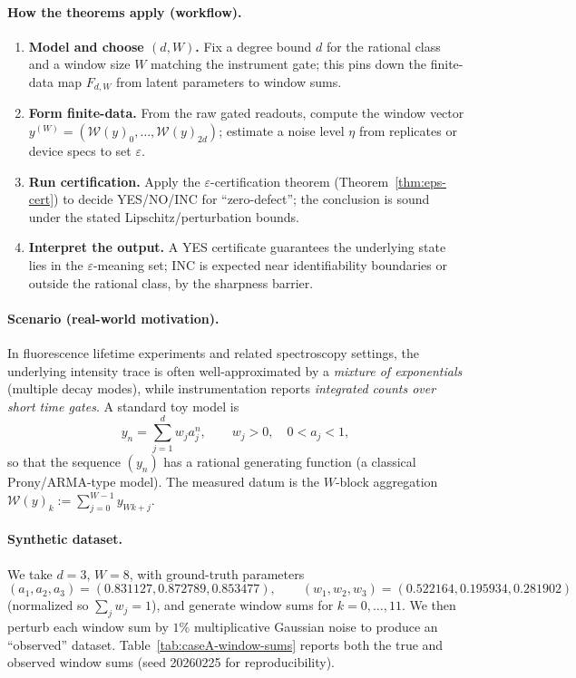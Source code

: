 \documentclass[11pt,reqno]{amsart}
\theoremstyle{definition}
\theoremstyle{remark}
\newcommand{\1}{\mathbf{1}}
\begin{document}
\paragraph{How the theorems apply (workflow).}
\begin{enumerate}
\item \textbf{Model and choose $(d,W)$.} Fix a degree bound $d$ for the rational class and a window size $W$ matching the instrument gate; this pins down the finite-data map $F_{d,W}$ from latent parameters to window sums.
\item \textbf{Form finite-data.} From the raw gated readouts, compute the window vector $y^{(W)}=(\mathcal W(y)_0,\dots,\mathcal W(y)_{2d})$; estimate a noise level $\eta$ from replicates or device specs to set $\varepsilon$.
\item \textbf{Run certification.} Apply the $\varepsilon$-certification theorem (Theorem~\ref{thm:eps-cert}) to decide \textsf{YES/NO/INC} for ``zero-defect''; the conclusion is sound under the stated Lipschitz/perturbation bounds.
\item \textbf{Interpret the output.} A \textsf{YES} certificate guarantees the underlying state lies in the $\varepsilon$-meaning set; \textsf{INC} is expected near identifiability boundaries or outside the rational class, by the sharpness barrier.
\end{enumerate}

\paragraph{Scenario (real-world motivation).}
In fluorescence lifetime experiments and related spectroscopy settings, the underlying intensity trace is often well-approximated by a \emph{mixture of exponentials} (multiple decay modes), while instrumentation reports \emph{integrated counts over short time gates}.
A standard toy model is
\[
y_n=\sum_{j=1}^{d} w_j a_j^n,\qquad w_j>0,\quad 0<a_j<1,
\]
so that the sequence $(y_n)$ has a rational generating function (a classical Prony/ARMA-type model).
The measured datum is the $W$-block aggregation $\mathcal W(y)_k:=\sum_{j=0}^{W-1} y_{Wk+j}$.

\paragraph{Synthetic dataset.}
We take $d=3$, $W=8$, with ground-truth parameters
\[
(a_1,a_2,a_3)=(0.831127, 0.872789, 0.853477),\qquad
(w_1,w_2,w_3)=(0.522164, 0.195934, 0.281902)
\]
(normalized so $\sum_j w_j=1$), and generate window sums for $k=0,\dots,11$.
We then perturb each window sum by $1\%$ multiplicative Gaussian noise to produce an ``observed'' dataset.
Table~\ref{tab:caseA-window-sums} reports both the true and observed window sums (seed 20260225 for reproducibility).
\end{document}
